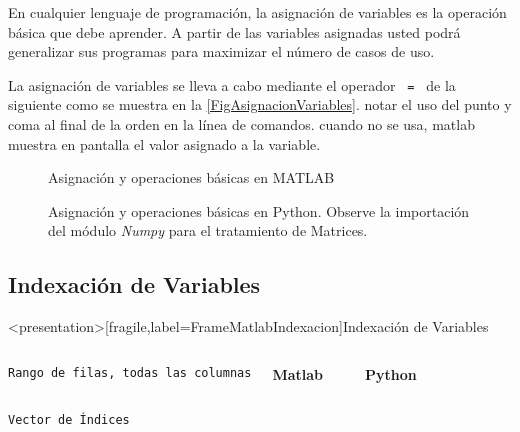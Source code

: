   En cualquier lenguaje de programación, la asignación 
  de variables es la operación básica que debe aprender.
  A partir de las variables asignadas usted podrá generalizar sus
  programas para maximizar el número de casos de uso. 

  La asignación de variables se lleva a cabo mediante
  el operador \texttt{ = } de la siguiente como se muestra
  en la \autoref{FigAsignacionVariables}. notar el uso 
  del punto y coma al final de la orden en la línea de 
  comandos. cuando no se usa, matlab muestra en pantalla
  el valor asignado a la variable.

\begin{figure}
\caption{Asignación y operaciones básicas en MATLAB\label{FigAsignacionVariables}}
\end{figure}

\begin{figure}
\caption{Asignación y operaciones básicas en Python. Observe la importación del 
        módulo \protect\emph{Numpy} para el tratamiento de Matrices. \protect\label{FigAsignacionVariablesPython}}
\end{figure}

\mode* 

\subsection{Indexación de Variables}

\begin{frame}<presentation>[fragile,label=FrameMatlabIndexacion]{Indexación de Variables}

\begin{columns}[T]
  \vspace{0.5cm}
\flushright \texttt{Rango de filas, todas las columnas}

  \textbf{Matlab}

\begin{codeblock}
  
\end{codeblock}
  \textbf{Python}
\begin{codeblock}
%  
  
\end{codeblock}

\end{columns}
  \vspace{0.5cm}
\begin{columns}[T]
\hfill \texttt{Vector de Índices}

\begin{codeblock}
  
\end{codeblock}

  \begin{codeblock}
    
  \end{codeblock}
\end{columns}
\end{frame}

